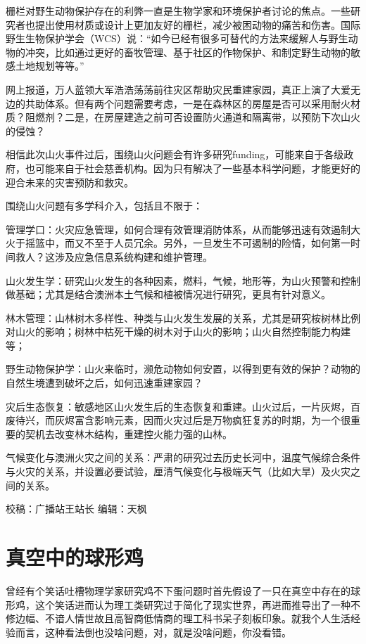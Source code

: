\documentclass[
]{book}
\begin{document}
栅栏对野生动物保护存在的利弊一直是生物学家和环境保护者讨论的焦点。一些研究者也提出使用材质或设计上更加友好的栅栏，减少被困动物的痛苦和伤害。国际野生生物保护学会（WCS）说：``如今已经有很多可替代的方法来缓解人与野生动物的冲突，比如通过更好的畜牧管理、基于社区的作物保护、和制定野生动物的敏感土地规划等等。''

网上报道，万人蓝领大军浩浩荡荡前往灾区帮助灾民重建家园，真正上演了大爱无边的共助体系。但有两个问题需要考虑，一是在森林区的房屋是否可以采用耐火材质？阻燃剂？二是，在房屋建造之前可否设置防火通道和隔离带，以预防下次山火的侵蚀？

相信此次山火事件过后，围绕山火问题会有许多研究funding，可能来自于各级政府，也可能来自于社会慈善机构。因为只有解决了一些基本科学问题，才能更好的迎合未来的灾害预防和救灾。

围绕山火问题有多学科介入，包括且不限于：

管理学口：火灾应急管理，如何合理有效管理消防体系，从而能够迅速有效遏制大火于摇篮中，而又不至于人员冗余。另外，一旦发生不可遏制的险情，如何第一时间救人？这涉及应急信息系统构建和维护管理。

山火发生学：研究山火发生的各种因素，燃料，气候，地形等，为山火预警和控制做基础；尤其是结合澳洲本土气候和植被情况进行研究，更具有针对意义。

林木管理：山林树木多样性、种类与山火发生发展的关系，尤其是研究桉树林比例对山火的影响；树林中枯死干燥的树木对于山火的影响；山火自然控制能力构建等；

野生动物保护学：山火来临时，濒危动物如何安置，以得到更有效的保护？动物的自然生境遭到破坏之后，如何迅速重建家园？

灾后生态恢复：敏感地区山火发生后的生态恢复和重建。山火过后，一片灰烬，百废待兴，而灰烬富含影响元素，因而火灾过后是万物疯狂复苏的时期，为一个很重要的契机去改变林木结构，重建控火能力强的山林。

气候变化与澳洲火灾之间的关系：严肃的研究过去历史长河中，温度气候综合条件与火灾的关系，并设置必要试验，厘清气候变化与极端天气（比如大旱）及火灾之间的关系。

校稿：广播站王站长
编辑：天枫

\hypertarget{ux771fux7a7aux4e2dux7684ux7403ux5f62ux9e21}{%
\section{真空中的球形鸡}\label{ux771fux7a7aux4e2dux7684ux7403ux5f62ux9e21}}

曾经有个笑话吐槽物理学家研究鸡不下蛋问题时首先假设了一只在真空中存在的球形鸡，这个笑话进而认为理工类研究过于简化了现实世界，再进而推导出了一种不修边幅、不谙人情世故且高智商低情商的理工科书呆子刻板印象。就我个人生活经验而言，这种看法倒也没啥问题，对，就是没啥问题，你没看错。
\end{document}
